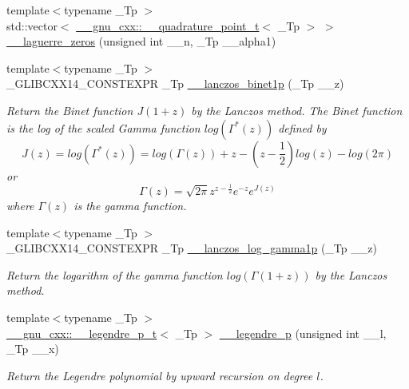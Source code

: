 \begin{DoxyCompactItemize}
{\footnotesize template$<$typename \+\_\+\+Tp $>$ }\\std\+::vector$<$ \hyperlink{struct____gnu__cxx_1_1____quadrature__point__t}{\+\_\+\+\_\+gnu\+\_\+cxx\+::\+\_\+\+\_\+quadrature\+\_\+point\+\_\+t}$<$ \+\_\+\+Tp $>$ $>$ \hyperlink{namespacestd_1_1____detail_a12f5145d6544afee991b30a30020e86b}{\+\_\+\+\_\+laguerre\+\_\+zeros} (unsigned int \+\_\+\+\_\+n, \+\_\+\+Tp \+\_\+\+\_\+alpha1)
\item 
{\footnotesize template$<$typename \+\_\+\+Tp $>$ }\\\+\_\+\+G\+L\+I\+B\+C\+X\+X14\+\_\+\+C\+O\+N\+S\+T\+E\+X\+PR \+\_\+\+Tp \hyperlink{namespacestd_1_1____detail_a84722b82d6d614aa4653eb7559f7d508}{\+\_\+\+\_\+lanczos\+\_\+binet1p} (\+\_\+\+Tp \+\_\+\+\_\+z)
\begin{DoxyCompactList}\small\item\em Return the Binet function $ J(1+z) $ by the Lanczos method. The Binet function is the log of the scaled Gamma function $ log(\Gamma^*(z)) $ defined by \[ J(z) = log(\Gamma^*(z)) = log\left(\Gamma(z)\right) + z - \left(z-\frac{1}{2}\right) log(z) - log(2\pi) \] or \[ \Gamma(z) = \sqrt{2\pi}z^{z-\frac{1}{2}}e^{-z}e^{J(z)} \] where $ \Gamma(z) $ is the gamma function. \end{DoxyCompactList}\item 
{\footnotesize template$<$typename \+\_\+\+Tp $>$ }\\\+\_\+\+G\+L\+I\+B\+C\+X\+X14\+\_\+\+C\+O\+N\+S\+T\+E\+X\+PR \+\_\+\+Tp \hyperlink{namespacestd_1_1____detail_a4586aeea80ba556ab8d6393dadb05c5c}{\+\_\+\+\_\+lanczos\+\_\+log\+\_\+gamma1p} (\+\_\+\+Tp \+\_\+\+\_\+z)
\begin{DoxyCompactList}\small\item\em Return the logarithm of the gamma function $ log(\Gamma(1+z)) $ by the Lanczos method. \end{DoxyCompactList}\item 
{\footnotesize template$<$typename \+\_\+\+Tp $>$ }\\\hyperlink{struct____gnu__cxx_1_1____legendre__p__t}{\+\_\+\+\_\+gnu\+\_\+cxx\+::\+\_\+\+\_\+legendre\+\_\+p\+\_\+t}$<$ \+\_\+\+Tp $>$ \hyperlink{namespacestd_1_1____detail_ab06b50bbac9758b5a2cc7d3d8213daa9}{\+\_\+\+\_\+legendre\+\_\+p} (unsigned int \+\_\+\+\_\+l, \+\_\+\+Tp \+\_\+\+\_\+x)
\begin{DoxyCompactList}\small\item\em Return the Legendre polynomial by upward recursion on degree $ l $. \end{DoxyCompactList}\item 

\end{DoxyCompactItemize}
